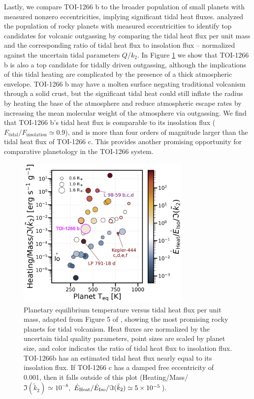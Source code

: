\documentclass[twocolumn]{aastex631}
\begin{document}
Lastly, we compare TOI-1266 b to the broader population of small planets with measured nonzero eccentricities, implying significant tidal heat fluxes. \cite{Seligman2023} analyzed the population of rocky planets with measured eccentricities to identify top candidates for volcanic outgassing by comparing the tidal heat flux per unit mass and the corresponding ratio of tidal heat flux to insolation flux -- normalized against the uncertain tidal parameters $Q$/$k_2$. In Figure \ref{fig:volcanism population plot} we show that TOI-1266 b is also a top candidate for tidally driven outgassing, although the implications of this tidal heating are complicated by the presence of a thick atmospheric envelope. TOI-1266 b may have a molten surface negating traditional volcanism through a solid crust, but the significant tidal heat could still inflate the radius by heating the base of the atmosphere and reduce atmospheric escape rates by increasing the mean molecular weight of the atmosphere via outgassing. We find that TOI-1266 b's tidal heat flux is comparable to its insolation flux ($F_{\mathrm{tidal}}/F_{\mathrm{insolation}} \simeq 0.9$), and is more than four orders of magnitude larger than the tidal heat flux of TOI-1266 c. This provides another promising opportunity for comparative planetology in the TOI-1266 system.   

\begin{figure}
  \includegraphics[width=8.5cm]{Tidal_Volcanism_Population_Fig.png}
  \caption{Planetary equilibrium temperature versus tidal heat flux per unit mass, adapted from Figure 5 of \cite{Seligman2023}, showing the most promising rocky planets for tidal volcanism. Heat fluxes are normalized by the uncertain tidal quality parameters, point sizes are scaled by planet size, and color indicates the ratio of tidal heat flux to insolation flux. TOI-1266b has an estimated tidal heat flux nearly equal to its insolation flux. If TOI-1266 c has a damped free eccentricity of 0.001, then it falls outside of this plot (Heating/Mass/$\Im(\tilde{k}_2) \simeq 10^{-8}$, $\dot{E}_{\rm Heat}/\dot{E}_{\rm Iso}/\Im(\tilde{k}_2) \simeq 5\times10^{-5}$).}
  \label{fig:volcanism population plot}
\end{figure}
\end{document}
